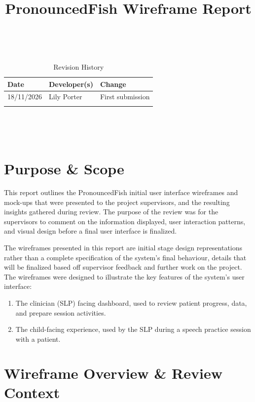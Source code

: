 \documentclass{article}
\title{PronouncedFish Wireframe Report\\\progname}
\author{\authname}
\date{}
\begin{document}
\maketitle
\thispagestyle{empty}

~\newpage


\begin{table}[hp]
\caption{Revision History} \label{TblRevisionHistory}
\begin{tabularx}{\textwidth}{llX}
\toprule
\textbf{Date} & \textbf{Developer(s)} & \textbf{Change}\\
\midrule
18/11/2026 & Lily Porter & First submission\\
 & & \\
\bottomrule
\end{tabularx}
\end{table}

~\newpage

\tableofcontents

~\newpage


\section{Purpose \& Scope}

This report outlines the PronouncedFish initial user interface wireframes and mock-ups that were presented to the project supervisors, and the resulting insights gathered during review. The purpose of the review was for the supervisors to comment on the information displayed, user interaction patterns, and visual design before a final user interface is finalized.

The wireframes presented in this report are initial stage design representations rather than a complete specification of the system's final behaviour, details that will be finalized based off supervisor feedback and further work on the project. The wireframes were designed to illustrate the key features of the system's user interface:
\begin{enumerate}
    \item The clinician (SLP) facing dashboard, used to review patient progress, data, and prepare session activities.
    \item The child-facing experience, used by the SLP during a speech practice session with a patient.
\end{enumerate}

\section{Wireframe Overview \& Review Context}
\end{document}
